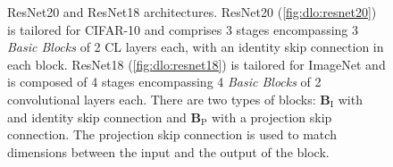 \begin{figure}
\centering
{}
  \hfill
{}

\caption{ResNet20 and ResNet18 architectures. ResNet20 (\cref{fig:dlo:resnet20})
is tailored for CIFAR-10 and comprises 3 stages encompassing 3 \emph{Basic
Blocks} of 2 \ac{CL} layers each, with an identity skip connection in each
block. ResNet18 (\cref{fig:dlo:resnet18}) is tailored for ImageNet and is
composed of 4 stages encompassing 4 \emph{Basic Blocks} of 2 convolutional
layers each. There are two types of blocks: $\mathbf{B}_\text{I}$ with and
identity skip connection and $\mathbf{B}_\text{P}$ with a projection skip
connection. The projection skip connection is used to match dimensions between
the input and the output of the block.}
\label{fig:dlo:resnets}
\end{figure}

